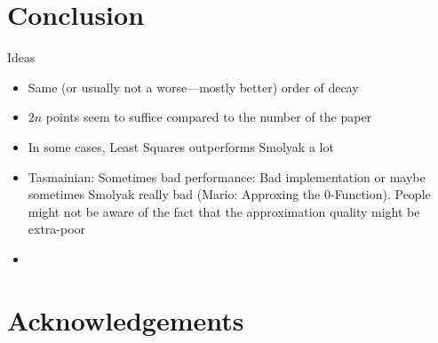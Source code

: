 \documentclass[12pt, oneside]{amsart}
\theoremstyle{definition}
\theoremstyle{remark}
\numberwithin{equation}{section}
\begin{document}
\section{Conclusion}\label{sec:conclusion}

Ideas
\begin{itemize}
	\item Same (or usually not a worse---mostly better) order of decay
	\item $2n$ points seem to suffice compared to the number of the paper
	\item In some cases, Least Squares outperforms Smolyak a lot
	\item Tasmainian: Sometimes bad performance: Bad implementation or maybe 
	sometimes Smolyak really bad (Mario: Approxing the $0$-Function). People 
	might not be aware of the fact that the approximation quality might be 
	extra-poor
	\item 
\end{itemize}


\section*{Acknowledgements}




\newpage

\nocite{*}
\printbibliography

\bigskip

\noindent
\address{J.E., Johannes Kepler University Linz; 
\texttt{jakob.eggl@jku.at}; \\
	E.M., Johannes Kepler University Linz; 
	\texttt{elias.mindlberger@jku.at}; \\
	M.U., Johannes Kepler University Linz; 
	\texttt{mario.ullrich@jku.at}
}
\end{document}
